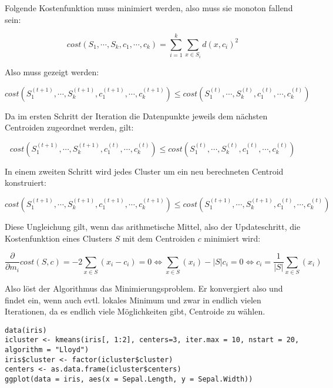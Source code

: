 \documentclass[a4paper,12pt,twoside]{article}
\begin{document}
Folgende Kostenfunktion muss minimiert werden, also muss sie monoton fallend sein:

\begin{equation}
cost(S_1, \cdots, S_k, c_1, \cdots, c_k) = \sum_{i=1}^{k} \sum_{x \in S_{i}} d(x,c_{i})^{2}
\end{equation}

Also muss gezeigt werden:

\begin{equation}
cost(S_1^{(t+1)}, \cdots, S_k^{(t+1)}, c_1^{(t+1)}, \cdots, c_k^{(t+1)}) \leq cost(S_1^{(t)}, \cdots, S_k^{(t)}, c_1^{(t)}, \cdots, c_k^{(t)})
\end{equation}

Da im ersten Schritt der Iteration die Datenpunkte jeweils dem nächsten Centroiden zugeordnet werden, gilt:

\begin{equation}
cost(S_1^{(t+1)}, \cdots, S_k^{(t+1)}, c_1^{(t)}, \cdots, c_k^{(t)}) \leq cost(S_1^{(t)}, \cdots, S_k^{(t)}, c_1^{(t)}, \cdots, c_k^{(t)})
\end{equation}

In einem zweiten Schritt wird jedes Cluster um ein neu berechneten Centroid konstruiert: 

\begin{equation}
cost(S_1^{(t+1)}, \cdots, S_k^{(t+1)}, c_1^{(t+1)}, \cdots, c_k^{(t+1)}) \leq cost(S_1^{(t+1)}, \cdots, S_k^{(t+1)}, c_1^{(t)}, \cdots, c_k^{(t)})
\end{equation}

Diese Ungleichung gilt, wenn das arithmetische Mittel, also der Updateschritt, die Kostenfunktion eines Clusters $S$ mit dem Centroiden $c$ minimiert wird:

\begin{equation}
\frac{\partial}{\partial m_i} cost(S, c) = -2 \sum_{x \in S} (x_i - c_i) = 0
\Leftrightarrow \sum_{x \in S} (x_i) - |S| c_i = 0
\Leftrightarrow c_i = \frac{1}{|S|} \sum_{x \in S} (x_i)
\end{equation}

Also löst der Algorithmus das Minimierungsproblem. Er konvergiert also und findet ein, wenn auch evtl. lokales Minimum und zwar in endlich vielen Iterationen, da es endlich viele Möglichkeiten gibt, Centroide zu wählen.

\begin{minipage}{\linewidth}
\begin{lstlisting}[caption={Load Dataset und Loyd Algorithmus}, label=list:lloyd] 
data(iris)
icluster <- kmeans(iris[, 1:2], centers=3, iter.max = 10, nstart = 20, algorithm = "Lloyd")
iris$cluster <- factor(icluster$cluster)
centers <- as.data.frame(icluster$centers)
ggplot(data = iris, aes(x = Sepal.Length, y = Sepal.Width)) 
\end{lstlisting}
\end{minipage}
\end{document}
